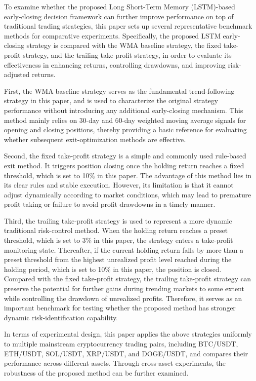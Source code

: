 \documentclass[12pt]{article}
\begin{document}
To examine whether the proposed Long Short-Term Memory (LSTM)-based early-closing decision 
framework can further improve performance on top of traditional trading strategies, this paper 
sets up several representative benchmark methods for comparative experiments. Specifically, 
the proposed LSTM early-closing strategy is compared with the WMA baseline strategy, the fixed 
take-profit strategy, and the trailing take-profit strategy, in order to evaluate its 
effectiveness in enhancing returns, controlling drawdowns, and improving risk-adjusted returns.

First, the WMA baseline strategy serves as the fundamental trend-following strategy in this 
paper, and is used to characterize the original strategy performance without introducing any 
additional early-closing mechanism. This method mainly relies on 30-day and 60-day weighted 
moving average signals for opening and closing positions, thereby providing a basic reference 
for evaluating whether subsequent exit-optimization methods are effective.

Second, the fixed take-profit strategy is a simple and commonly used rule-based exit method. 
It triggers position closing once the holding return reaches a fixed threshold, which is set 
to 10\% in this paper. The advantage of this method lies in its clear rules and stable 
execution. However, its limitation is that it cannot adjust dynamically according to market 
conditions, which may lead to premature profit taking or failure to avoid profit drawdowns in 
a timely manner.

Third, the trailing take-profit strategy is used to represent a more dynamic traditional 
risk-control method. When the holding return reaches a preset threshold, which is set to 3\% 
in this paper, the strategy enters a take-profit monitoring state. Thereafter, if the current 
holding return falls by more than a preset threshold from the highest unrealized profit level 
reached during the holding period, which is set to 10\% in this paper, the position is closed. 
Compared with the fixed take-profit strategy, the trailing take-profit strategy can preserve 
the potential for further gains during trending markets to some extent while controlling the 
drawdown of unrealized profits. Therefore, it serves as an important benchmark for testing 
whether the proposed method has stronger dynamic risk-identification capability.

In terms of experimental design, this paper applies the above strategies uniformly to 
multiple mainstream cryptocurrency trading pairs, including BTC/USDT, ETH/USDT, SOL/USDT, 
XRP/USDT, and DOGE/USDT, and compares their performance across different assets. Through 
cross-asset experiments, the robustness of the proposed method can be further examined.
\end{document}
